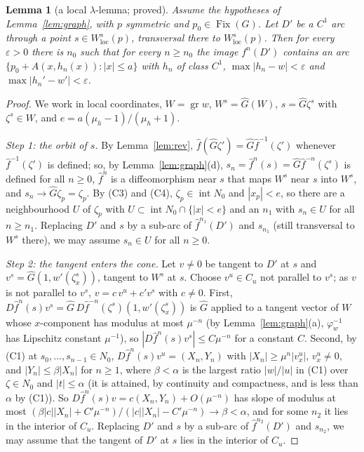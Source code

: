 \documentclass[11pt]{article}
\newtheorem{lemma}{Lemma}
\theoremstyle{definition}
\newcommand{\Fix}{\operatorname{Fix}}
\begin{document}
\begin{lemma}[a local $\lambda$-lemma; proved]\label{lem:lambda}
Assume the hypotheses of Lemma~\ref{lem:graph}, with $p$ symmetric and $p_0 \in \Fix(G)$. Let $D'$ be a $C^1$ arc through a point $s \in W^s_{\mathrm{loc}}(p)$, transversal there to $W^s_{\mathrm{loc}}(p)$. Then for every $\varepsilon > 0$ there is $n_0$ such that for every $n \ge n_0$ the image $f^n(D')$ contains an arc $\{p_0 + A(x, h_n(x)) : |x| \le a\}$ with $h_n$ of class $C^1$, $\max|h_n - w| < \varepsilon$ and $\max|h_n' - w'| < \varepsilon$.
\end{lemma}

\begin{proof}
We work in local coordinates, $W = \operatorname{gr}w$, $W^s = \hat G(W)$, $s = \hat G\zeta^s$ with $\zeta^s \in W$, and $e = a(\mu_h - 1)/(\mu_h + 1)$.

\emph{Step 1: the orbit of $s$.} By Lemma~\ref{lem:rev}, $\hat f(\hat G\zeta') = \hat G\hat f^{-1}(\zeta')$ whenever $\hat f^{-1}(\zeta')$ is defined; so, by Lemma~\ref{lem:graph}(d), $s_n = \hat f^n(s) = \hat G\hat f^{-n}(\zeta^s)$ is defined for all $n \ge 0$, $\hat f^n$ is a diffeomorphism near $s$ that maps $W^s$ near $s$ into $W^s$, and $s_n \to \hat G\zeta_p = \zeta_p$. By (C3) and (C4), $\zeta_p \in \operatorname{int}N_0$ and $|x_p| < e$, so there are a neighbourhood $U$ of $\zeta_p$ with $U \subset \operatorname{int}N_0 \cap \{|x| < e\}$ and an $n_1$ with $s_n \in U$ for all $n \ge n_1$. Replacing $D'$ and $s$ by a sub-arc of $\hat f^{n_1}(D')$ and $s_{n_1}$ (still transversal to $W^s$ there), we may assume $s_n \in U$ for all $n \ge 0$.

\emph{Step 2: the tangent enters the cone.} Let $v \ne 0$ be tangent to $D'$ at $s$ and $v^s = \hat G(1, w'(\zeta^s_x))$, tangent to $W^s$ at $s$. Choose $v^u \in C_u$ not parallel to $v^s$; as $v$ is not parallel to $v^s$, $v = c\,v^u + c'v^s$ with $c \ne 0$. First, $D\hat f^n(s)v^s = \hat G\,D\hat f^{-n}(\zeta^s)(1, w'(\zeta^s_x))$ is $\hat G$ applied to a tangent vector of $W$ whose $x$-component has modulus at most $\mu^{-n}$ (by Lemma~\ref{lem:graph}(a), $\varphi_w^{-1}$ has Lipschitz constant $\mu^{-1}$), so $|D\hat f^n(s)v^s| \le C\mu^{-n}$ for a constant $C$. Second, by (C1) at $s_0, \ldots, s_{n-1} \in N_0$, $D\hat f^n(s)v^u = (X_n, Y_n)$ with $|X_n| \ge \mu^n|v^u_x|$, $v^u_x \ne 0$, and $|Y_n| \le \beta|X_n|$ for $n \ge 1$, where $\beta < \alpha$ is the largest ratio $|w|/|u|$ in (C1) over $\zeta \in N_0$ and $|t| \le \alpha$ (it is attained, by continuity and compactness, and is less than $\alpha$ by (C1)). So $D\hat f^n(s)v = c(X_n, Y_n) + O(\mu^{-n})$ has slope of modulus at most $(\beta|c||X_n| + C'\mu^{-n})/(|c||X_n| - C'\mu^{-n}) \to \beta < \alpha$, and for some $n_2$ it lies in the interior of $C_u$. Replacing $D'$ and $s$ by a sub-arc of $\hat f^{n_2}(D')$ and $s_{n_2}$, we may assume that the tangent of $D'$ at $s$ lies in the interior of $C_u$.


\end{proof}
\end{document}
